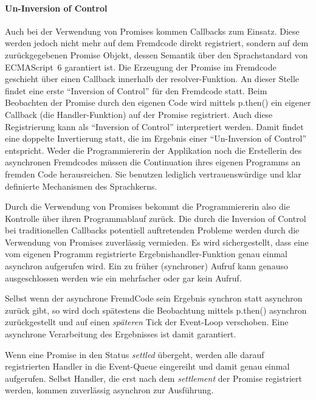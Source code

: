 \documentclass[
11pt, %
a4paper, %
oneside, %
pdfspacing, %
headinclude,
BCOR5mm, %
ngerman, %
bibtotocnumbered,
]{scrartcl}
\begin{document}
		\paragraph{Un-Inversion of Control}
		Auch bei der Verwendung von Promises kommen Callbacks zum Einsatz. Diese werden jedoch nicht mehr auf dem Fremdcode direkt registriert, sondern auf dem zurückgegebenen Promise Objekt, dessen Semantik über den Sprachstandard von ECMAScript~6 garantiert ist. Die Erzeugung der Promise im Fremd\-code geschieht über einen Callback innerhalb der resolver-Funktion. An dieser Stelle findet eine erste "`Inversion of Control"' für den Fremd\-code statt. Beim Beobachten der Promise durch den eigenen \-Code wird mittels \textsf{p.then()} ein eigener Callback (die Handler-Funktion) auf der Promise registriert. Auch diese Registrierung kann als "`Inversion of Control"' interpretiert werden. Damit findet eine doppelte Invertierung statt, die im Ergebnis einer "`Un-Inversion of Control"' entspricht. Weder die Programmiererin der Applikation noch die Erstellerin des asynchronen Fremd\-codes müssen die Continuation ihres eigenen Programms an fremden Code herausreichen. Sie benutzen lediglich vertrauenswürdige und klar definierte Mechanismen des Sprachkerns.
		
		Durch die Verwendung von Promises bekommt die Programmiererin also die Kontrolle über ihren Programmablauf zurück. Die durch die Inversion of Control bei traditionellen Callbacks potentiell auftretenden Probleme werden durch die Verwendung von Promises zuverlässig vermieden. Es wird sichergestellt, dass eine vom eigenen Programm registrierte Ergebnishandler-Funktion genau einmal asynchron aufgerufen wird. Ein zu früher (synchroner) Aufruf kann genauso ausgeschlossen werden wie ein mehrfacher oder gar kein Aufruf.
				
		Selbst wenn der asynchrone Fremd\-Code sein Ergebnis synchron statt asynchron zurück gibt, so wird doch spätestens die Beobachtung mittels \textsf{p.then()} asynchron zurückgestellt und auf einen \textit{späteren} Tick der Event-Loop verschoben. Eine asynchrone Verarbeitung des Ergebnisses ist damit garantiert.
		
		Wenn eine Promise in den Status \textit{settled} übergeht, werden  alle darauf registrierten Handler in die Event-Queue eingereiht und damit genau einmal aufgerufen. Selbst Handler, die erst nach dem \textit{settlement} der Promise registriert werden, kommen zuverlässig asynchron zur Ausführung. 
		
\end{document}
